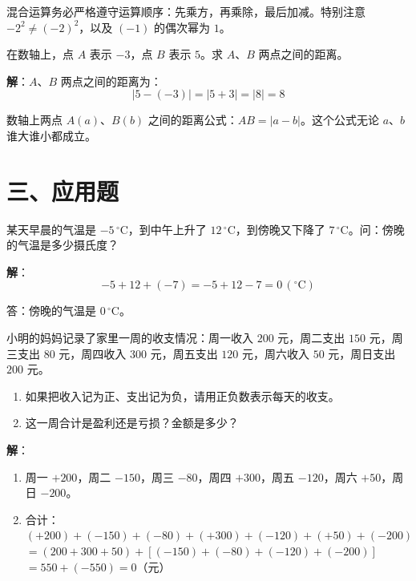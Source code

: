 \documentclass[12pt, a4paper]{ctexart}
\begin{document}
\begin{tipbox}[方法总结]
混合运算务必严格遵守运算顺序：先乘方，再乘除，最后加减。特别注意 $-2^2 \neq (-2)^2$，以及 $(-1)$ 的偶次幂为 $1$。
\end{tipbox}

\vspace{6pt}

\begin{examplebox}[【例题7】数轴与绝对值的综合]
在数轴上，点 $A$ 表示 $-3$，点 $B$ 表示 $5$。求 $A$、$B$ 两点之间的距离。
\end{examplebox}

\textbf{解}：$A$、$B$ 两点之间的距离为：
\[
|5 - (-3)| = |5 + 3| = |8| = 8
\]

\begin{tipbox}[方法总结]
数轴上两点 $A(a)$、$B(b)$ 之间的距离公式：$AB = |a - b|$。这个公式无论 $a$、$b$ 谁大谁小都成立。
\end{tipbox}


\section*{\textcolor{apppurple}{三、应用题}}

\begin{appbox}[【应用1】温度问题]
某天早晨的气温是 $-5\,^\circ\mathrm{C}$，到中午上升了 $12\,^\circ\mathrm{C}$，到傍晚又下降了 $7\,^\circ\mathrm{C}$。问：傍晚的气温是多少摄氏度？
\end{appbox}

\textbf{解}：
\[
-5 + 12 + (-7) = -5 + 12 - 7 = 0\,(^\circ\mathrm{C})
\]

答：傍晚的气温是 $0\,^\circ\mathrm{C}$。

\begin{appbox}[【应用2】财务收支问题]
小明的妈妈记录了家里一周的收支情况：周一收入 $200$ 元，周二支出 $150$ 元，周三支出 $80$ 元，周四收入 $300$ 元，周五支出 $120$ 元，周六收入 $50$ 元，周日支出 $200$ 元。
\begin{enumerate}[leftmargin=*]
  \item 如果把收入记为正、支出记为负，请用正负数表示每天的收支。
  \item 这一周合计是盈利还是亏损？金额是多少？
\end{enumerate}
\end{appbox}

\textbf{解}：
\begin{enumerate}[leftmargin=*]
  \item 周一 $+200$，周二 $-150$，周三 $-80$，周四 $+300$，周五 $-120$，周六 $+50$，周日 $-200$。
  \item 合计：$(+200) + (-150) + (-80) + (+300) + (-120) + (+50) + (-200)$\\
  $= (200 + 300 + 50) + [(-150) + (-80) + (-120) + (-200)]$\\
  $= 550 + (-550) = 0$（元）
\end{enumerate}
\end{document}
